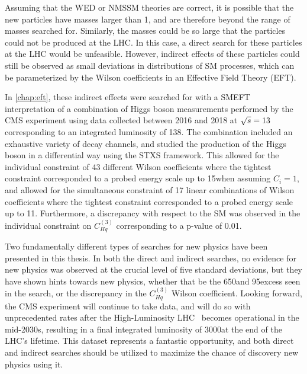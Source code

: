Assuming that the WED or NMSSM theories are correct, it is possible that the new particles have masses larger than 1\TeV, and are therefore beyond the range of masses searched for. Similarly, the masses could be so large that the particles could not be produced at the LHC. In this case, a direct search for these particles at the LHC would be unfeasible. However, indirect effects of these particles could still be observed as small deviations in distributions of SM processes, which can be parameterized by the Wilson coefficients in an Effective Field Theory (EFT). 

In \cref{chap:eft}, these indirect effects were searched for with a SMEFT interpretation of a combination of Higgs boson measurements performed by the CMS experiment using data collected between 2016 and 2018 at $\sqrt{s}=13$\TeV corresponding to an integrated luminosity of 138\fbinv. The combination included an exhaustive variety of decay channels, and studied the production of the Higgs boson in a differential way using the STXS framework. This allowed for the individual constraint of 43 different Wilson coefficients where the tightest constraint corresponded to a probed energy scale up to 15\TeV when assuming $C_i=1$, and allowed for the simultaneous constraint of 17 linear combinations of Wilson coefficients where the tightest constraint corresponded to a probed energy scale up to 11\TeV. Furthermore, a discrepancy with respect to the SM was observed in the individual constraint on $C_{Hq}^{(3)}$ corresponding to a p-value of 0.01.

Two fundamentally different types of searches for new physics have been presented in this thesis. In both the direct and indirect searches, no evidence for new physics was observed at the crucial level of five standard deviations, but they have shown hints towards new physics, whether that be the 650\GeV and 95\GeV excess seen in the \XYH search, or the discrepancy in the $C_{Hq}^{(3)}$ Wilson coefficient. Looking forward, the CMS experiment will continue to take data, and will do so with unprecedented rates after the High-Luminosity LHC~\cite{ZurbanoFernandez:2020cco} becomes operational in the mid-2030s, resulting in a final integrated luminosity of 3000\fbinv at the end of the LHC's lifetime. This dataset represents a fantastic opportunity, and both direct and indirect searches should be utilized to maximize the chance of discovery new physics using it.